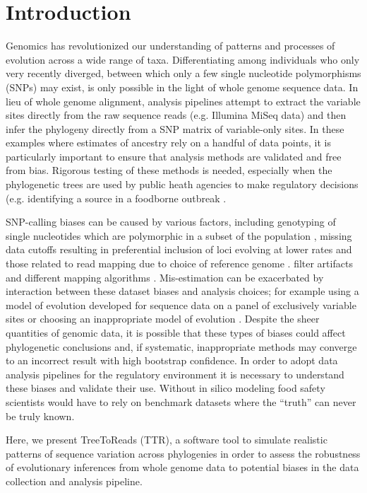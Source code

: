 \section{Introduction}
Genomics has revolutionized our understanding of patterns and processes of evolution across a wide range of taxa. 
Differentiating among individuals who only very recently diverged, between which only a few single nucleotide polymorphisms (SNPs) may exist, 
is only possible in the light of whole genome sequence data. 
In lieu of whole genome alignment, analysis pipelines attempt to extract the variable sites directly from the raw sequence reads (e.g. Illumina MiSeq data) 
and then infer the phylogeny directly from a SNP matrix of variable-only sites. In these examples where estimates of ancestry rely on a handful of data points, 
it is particularly important to ensure that analysis methods are validated and free from bias. Rigorous testing of these methods is needed,
especially when the phylogenetic trees are used by public heath agencies to make regulatory decisions (e.g. identifying a source in a foodborne outbreak \citep{hoffmann_tracing_2015}. 

SNP-calling biases can be caused by various factors, 
including genotyping of single nucleotides which are polymorphic in a subset of the population \citep{mctavish_how_2015}, 
missing data cutoffs resulting in preferential inclusion of loci evolving at lower rates \citep{huang_unforeseen_2014} and those related to read mapping due to choice of reference genome \citep{bertels_automated_2014}. 
filter artifacts \citep{li_toward_2014} and different mapping algorithms \citep{pightling_choice_2014}. 
Mis-estimation can be exacerbated by interaction between these dataset biases and analysis choices; 
for example using a model of evolution developed for sequence data on a panel of exclusively variable sites \citep{lewis_likelihood_2001} 
or choosing an inappropriate model of evolution \citep{sullivan_are_1997}. Despite the sheer quantities of genomic data, 
it is possible that these types of biases could affect phylogenetic conclusions and, if systematic, inappropriate methods may converge to an incorrect result with high bootstrap confidence. 
In order to adopt data analysis pipelines for the regulatory environment it is necessary to understand these biases and validate their use. 
Without in silico modeling food safety scientists would have to rely on benchmark datasets where the “truth” can never be truly known.

Here, we present TreeToReads (TTR), a software tool to simulate realistic patterns of sequence variation across phylogenies 
in order to assess the robustness of evolutionary inferences from whole genome data to potential biases in the data collection and analysis pipeline. 


